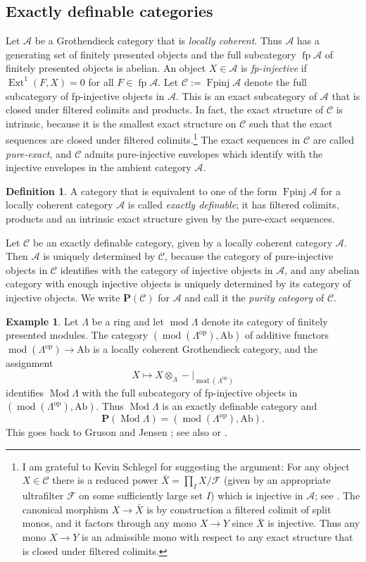 \documentclass[a4paper]{amsart}
\theoremstyle{plain}
\theoremstyle{definition}
\newtheorem{defn}[thm]{Definition}
\newtheorem{exm}[thm]{Example}
\theoremstyle{remark}
\numberwithin{equation}{section}
\newcommand{\Ext}{\operatorname{Ext}}
\newcommand{\fp}{\operatorname{fp}}
\newcommand{\Fpinj}{\operatorname{Fpinj}}
\newcommand{\mmod}{\operatorname{mod}}
\newcommand{\Mod}{\operatorname{Mod}}
\newcommand{\Ab}{\mathrm{Ab}}
\newcommand{\op}{\mathrm{op}}
\def\A{\mathcal A}
\def\C{\mathcal C}
\def\F{\mathcal F}
\def\bfP{\mathbf P}
\def\La{\Lambda}
\begin{document}
\subsection*{Exactly definable categories}\label{se:ex-definable}

Let $\A$ be a Grothendieck category that is \emph{locally
  coherent}. Thus $\A$ has a generating set of finitely presented
objects and the full subcategory $\fp\A$ of finitely presented objects
is abelian. An object $X\in\A$ is \emph{fp-injective} if
$\Ext^1(F,X)=0$ for all $F\in\fp\A$.  Let $\C:=\Fpinj\A$ denote the
full subcategory of fp-injective objects in $\A$. This is an exact
subcategory of $\A$ that is closed under filtered colimits and
products. In fact, the exact structure of $\C$ is intrinsic, because
it is the smallest exact structure on $\C$ such that the exact
sequences are closed under filtered colimits.\footnote{I am grateful
  to Kevin Schlegel for suggesting the argument: For any object
  $X\in\C$ there is a reduced power $\bar X=\prod_I X/\F$ (given by an
  appropriate ultrafilter $\F$ on some sufficiently large set $I$)
  which is injective in $\A$; see \cite[4.2.5]{Pr2009}. The canonical
  morphism $X\to \bar X$ is by construction a filtered colimit of
  split monos, and it factors through any mono $X\to Y$ since $\bar X$
  is injective. Thus any mono $X\to Y$ is an admissible mono with
  respect to any exact structure that is closed under filtered
  colimits.} The exact sequences in $\C$ are called \emph{pure-exact},
and $\C$ admits pure-injective envelopes which identify with the
injective envelopes in the ambient category $\A$.

\begin{defn}\label{de:ex-def}
  A category that is equivalent to one of the form $\Fpinj\A$ for a
  locally coherent category $\A$ is called \emph{exactly definable};
  it has filtered colimits, products and an intrinsic exact structure
  given by the pure-exact sequences.
\end{defn}

Let $\C$ be an exactly definable category, given by a locally coherent
category $\A$. Then $\A$ is uniquely determined by $\C$, because the
category of pure-injective objects in $\C$ identifies with the
category of injective objects in $\A$, and any abelian category with
enough injective objects is uniquely determined by its category of
injective objects. We write $\bfP(\C)$ for $\A$ and call it the
\emph{purity category} of $\C$.

\begin{exm}\label{ex:ex-def}
Let $\La$ be a ring and let $\mmod\La$ denote its category of finitely presented
modules. The category $(\mmod(\La^\op),\Ab)$ of additive
functors $\mmod(\La^\op)\to\Ab$ is a locally coherent Grothendieck
category, and the assignment \[X\longmapsto X\otimes_\La
  -|_{\mmod(\La^\op)}\]
identifies $\Mod\La$ with the full subcategory of fp-injective objects
in $(\mmod(\La^\op),\Ab)$. Thus $\Mod\La$ is an exactly definable
category and
\[\bfP(\Mod\La)=(\mmod(\La^\op),\Ab).\]
This goes back to Gruson and Jensen
\cite{GJ1981}; see also  \cite[\S3]{CB1994} or \cite[12.4]{Kr2022}.
\end{exm}
\end{document}
